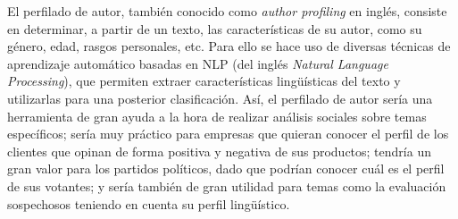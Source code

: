 \bigskip
El perfilado de autor, también conocido como \textit{author profiling} en inglés, consiste en determinar, a partir de un texto, 
las características de su autor, como su género, edad, rasgos personales, etc. Para ello se hace uso de diversas técnicas de aprendizaje automático
basadas en NLP (del inglés \textit{Natural Language Processing}), que permiten extraer características lingüísticas del texto y utilizarlas para una
posterior clasificación. Así, el perfilado de autor sería una herramienta de gran ayuda a la hora de realizar
análisis sociales sobre temas específicos; sería muy práctico para empresas que quieran conocer el perfil de los clientes que opinan de 
forma positiva y negativa de sus productos; tendría un gran valor
para los partidos políticos, dado que podrían conocer cuál es el perfil de sus votantes; y sería también de gran utilidad para temas como la evaluación
sospechosos teniendo en cuenta su perfil lingüístico.
